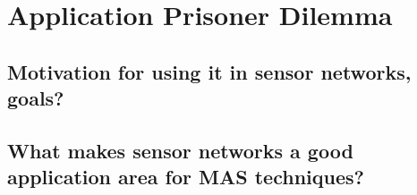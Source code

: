 \section{Application Prisoner Dilemma}
\subsection{Motivation for using it in sensor networks, goals?}
\subsection{What makes sensor networks a good application area for MAS techniques?}
